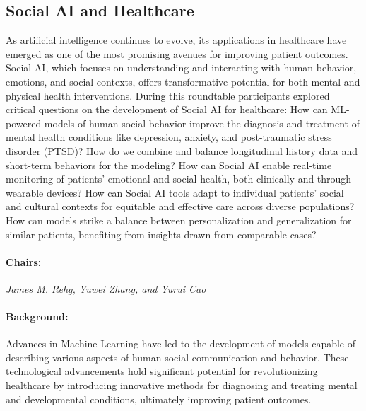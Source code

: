 \subsection{Social AI and Healthcare}


As artificial intelligence continues to evolve, its applications in healthcare have emerged as one of the most promising avenues for improving patient outcomes. Social AI, which focuses on understanding and interacting with human behavior, emotions, and social contexts, offers transformative potential for both mental and physical health interventions.  During this roundtable participants explored critical questions on the development of Social AI for healthcare:
How can ML-powered models of human social behavior improve the diagnosis and treatment of mental health conditions like depression, anxiety, and post-traumatic stress disorder (PTSD)? How do we combine and balance longitudinal history data and short-term behaviors for the modeling? How can Social AI enable real-time monitoring of patients' emotional and social health, both clinically and through wearable devices? How can Social AI tools adapt to individual patients' social and cultural contexts for equitable and effective care across diverse populations? How can models strike a balance between personalization and generalization for similar patients, benefiting from insights drawn from comparable cases?

\paragraph{Chairs:}
\textit{James M. Rehg, Yuwei Zhang, and Yurui Cao}

\paragraph{Background:} 

Advances in Machine Learning have led to the development of models capable of describing various aspects of human social communication and behavior.
These technological advancements hold significant potential for revolutionizing healthcare by introducing innovative methods for diagnosing and treating mental and developmental conditions, ultimately improving patient outcomes.

